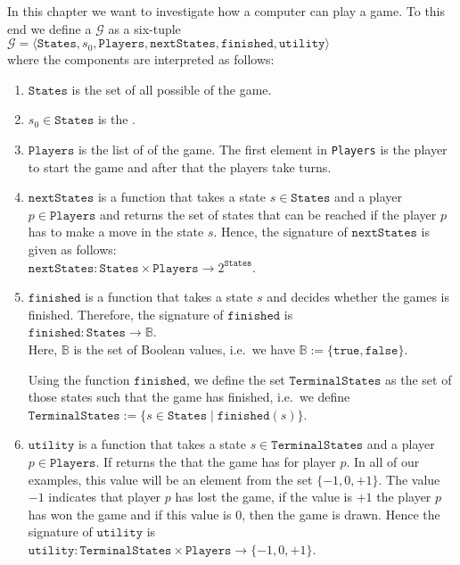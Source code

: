 In this chapter we want to investigate how a computer can play a game.  To this end we define a
 $\mathcal{G}$ as a six-tuple
\\[0.2cm]
\hspace*{1.3cm}
$\mathcal{G} = \langle \texttt{States}, s_0, \texttt{Players}, \texttt{nextStates}, \texttt{finished},\texttt{utility} \rangle$
\\[0.2cm]
where the components are interpreted as follows:
\begin{enumerate}
\item $\texttt{States}$ is the set of all possible  of the game.
\item $s_0 \in \texttt{States}$ is the .
\item $\texttt{Players}$ is  the list of  of the game.  The first element in \texttt{Players} is
      the player to start the game and after that the players take turns.
\item $\texttt{nextStates}$ is a function that takes a state $s \in \texttt{States}$ and a player $p \in \texttt{Players}$ and returns the set of
      states that can be reached if the player $p$ has to make a move in the state $s$.  Hence, the signature of
      $\texttt{nextStates}$ is given as follows:
      \\[0.2cm]
      \hspace*{1.3cm}
      $\texttt{nextStates}: \texttt{States} \times \texttt{Players} \rightarrow 2^{\texttt{States}}$.
\item $\texttt{finished}$ is a function that takes a state $s$ and decides whether the games is finished.
      Therefore, the signature of $\texttt{finished}$ is
      \\[0.2cm]
      \hspace*{1.3cm}
      $\texttt{finished}: \texttt{States} \rightarrow \mathbb{B}$.
      \\[0.2cm]
      Here, $\mathbb{B}$ is the set of Boolean values, i.e.~we have $\mathbb{B} := \{ \texttt{true}, \texttt{false} \}$.
  
      Using the function $\texttt{finished}$, we define the set $\texttt{TerminalStates}$ as the set of those
      states such that the game has finished,  i.e.~we define
      \\[0.2cm]
      \hspace*{1.3cm}
      $\texttt{TerminalStates} := \{ s \in \texttt{States} \mid \texttt{finished}(s) \}$.
\item $\texttt{utility}$ is a function that takes a state $s \in \texttt{TerminalStates}$ and a player $p \in \texttt{Players}$.  If returns
      the  that the game has for player $p$.  In all of our examples, this value will be an element
      from the set $\{-1, 0, +1\}$.  The value $-1$ indicates that player $p$ has lost the game,
      if the value is $+1$ the player $p$ has won the game and if this value is $0$, then the game is drawn.
      Hence the signature of $\texttt{utility}$ is
      \\[0.2cm]
      \hspace*{1.3cm}
      $\texttt{utility}: \texttt{TerminalStates} \times \texttt{Players} \rightarrow \{ -1, 0, +1\}$.
\end{enumerate}

